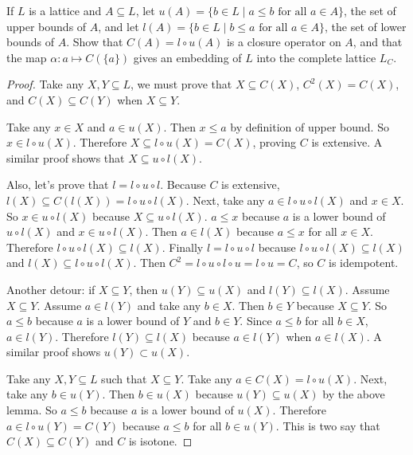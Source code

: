 \begin{theorem*}
If $L$ is a lattice and $A \subseteq L$,
let $u(A) = \{ b \in L \mid a \leq b \text{ for all } a \in A \}$, the set of upper bounds of $A$,
and let $l(A) = \{ b \in L \mid b \leq a \text{ for all } a \in A \}$, the set of lower bounds of $A$.
Show that $C(A) = l \circ u (A)$ is a closure operator on $A$, and that the map $\alpha : a \mapsto C(\{a\})$ gives an embedding of $L$ into the complete lattice $L_C$.
\end{theorem*}

\begin{proof}
Take any $X, Y \subseteq L$, we must prove that $X \subseteq C(X)$, $C^2(X) = C(X)$, and $C(X) \subseteq C(Y)$ when $X\subseteq Y$.

Take any $x \in X$ and $a \in u(X)$.
Then $x \leq a$ by definition of upper bound.
So $x \in l\circ u(X)$.
Therefore $X \subseteq  l\circ u(X) = C(X)$, proving $C$ is extensive.
A similar proof shows that $X \subseteq u\circ l(X)$.

Also, let's prove that $l = l \circ u \circ l$.
Because $C$ is extensive, $l(X) \subseteq C(l(X)) = l \circ u  \circ l(X)$.
Next, take any $a \in l \circ u \circ l (X)$ and $x \in X$.
So $x \in u \circ l(X)$ because $X\subseteq u\circ l(X)$.
$a \leq x$ because $a$ is a lower bound of $u \circ l (X)$ and $x \in u \circ l (X)$.
Then $a \in l(X)$ because $a \leq x$ for all $x \in X$. 
Therefore $l \circ u  \circ l(X) \subseteq l(X)$.
Finally $l = l \circ u \circ l$ because $l \circ u  \circ l(X) \subseteq l(X)$ and $l(X) \subseteq l \circ u  \circ l(X)$.
Then $C^2 = l \circ u \circ l \circ u = l \circ u  = C$, so $C$ is idempotent.

Another detour: if $X \subseteq Y$, then $u(Y) \subseteq u(X)$ and $l(Y) \subseteq l(X)$.
Assume $X \subseteq Y$.
Assume $a \in l(Y)$ and take any $b \in X$.
Then $b \in Y$ because $X \subseteq Y$.
So $a \leq b$ because $a$ is a lower bound of $Y$ and $b \in Y$.
Since $a \leq b$ for all $b\in X$, $a \in l(Y)$.
Therefore $l(Y) \subseteq l(X)$ because $a\in l(Y)$ when $a\in l(X)$.
A similar proof shows $u(Y) \subset u(X)$.

Take any $X, Y \subseteq L$ such that $X \subseteq Y$.
Take any $a \in C(X) = l \circ u (X)$.
Next, take any $b \in u(Y)$.
Then $b \in u(X)$ because $u(Y) \subseteq u(X)$ by the above lemma.
So $a \leq b$ because $a$ is a lower bound of $u(X)$.
Therefore $a \in l\circ u(Y) = C(Y)$ because $a \leq b$ for all $b\in u(Y)$.
This is two say that $C(X) \subseteq C(Y)$ and $C$ is isotone.


\end{proof}
